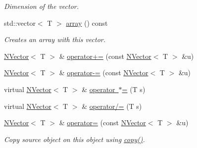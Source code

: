 \begin{DoxyCompactItemize}
\begin{DoxyCompactList}\small\item\em Dimension of the vector. \end{DoxyCompactList}\item 
std\+::vector$<$ T $>$ \mbox{\hyperlink{class_n_vector_aa99d9fea7e30357df42f736013506fe1}{array}} () const
\begin{DoxyCompactList}\small\item\em Creates an array with {\ttfamily this} vector. \end{DoxyCompactList}\item 
\mbox{\hyperlink{class_n_vector}{N\+Vector}}$<$ T $>$ \& \mbox{\hyperlink{class_n_vector_a493c3ac08bab3361ad475fc0360ee489}{operator+=}} (const \mbox{\hyperlink{class_n_vector}{N\+Vector}}$<$ T $>$ \&u)
\item 
\mbox{\hyperlink{class_n_vector}{N\+Vector}}$<$ T $>$ \& \mbox{\hyperlink{class_n_vector_af402cb6a52bf52d08286cfa8edb6afaa}{operator-\/=}} (const \mbox{\hyperlink{class_n_vector}{N\+Vector}}$<$ T $>$ \&u)
\item 
virtual \mbox{\hyperlink{class_n_vector}{N\+Vector}}$<$ T $>$ \& \mbox{\hyperlink{class_n_vector_a1630b8394837cf1ddf808f2761136771}{operator $\ast$=}} (T s)
\item 
virtual \mbox{\hyperlink{class_n_vector}{N\+Vector}}$<$ T $>$ \& \mbox{\hyperlink{class_n_vector_ac6dc40f82bad305c159643de675e7395}{operator/=}} (T s)
\item 
\mbox{\hyperlink{class_n_vector}{N\+Vector}}$<$ T $>$ \& \mbox{\hyperlink{class_n_vector_ab793bf6d3d3fc05f91f435c1c0a8e5ea}{operator=}} (const \mbox{\hyperlink{class_n_vector}{N\+Vector}}$<$ T $>$ \&u)
\begin{DoxyCompactList}\small\item\em Copy source object on this object using {\ttfamily \mbox{\hyperlink{class_n_vector_a67128d2ff536b8ccd7a95cb680bd0431}{copy()}}}. \end{DoxyCompactList}\end{DoxyCompactItemize}
